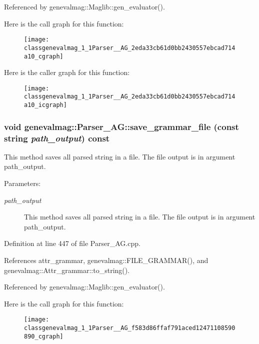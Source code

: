 Referenced by genevalmag::Maglib::gen\_\-evaluator().

Here is the call graph for this function:\nopagebreak
\begin{figure}[H]
\begin{center}
\leavevmode
\texttt{[image: classgenevalmag\_1\_1Parser\_\_AG\_2eda33cb61d0bb2430557ebcad714a10\_cgraph]}
\end{center}
\end{figure}


Here is the caller graph for this function:\nopagebreak
\begin{figure}[H]
\begin{center}
\leavevmode
\texttt{[image: classgenevalmag\_1\_1Parser\_\_AG\_2eda33cb61d0bb2430557ebcad714a10\_icgraph]}
\end{center}
\end{figure}
\hypertarget{classgenevalmag_1_1Parser__AG_f583d86ffaf791aced12471108590890}{
\subsubsection[{save\_\-grammar\_\-file}]{\setlength{\rightskip}{0pt plus 5cm}void genevalmag::Parser\_\-AG::save\_\-grammar\_\-file (const string {\em path\_\-output}) const}}
\label{classgenevalmag_1_1Parser__AG_f583d86ffaf791aced12471108590890}


This method saves all parsed string in a file. The file output is in argument path\_\-output. \begin{Desc}
\item[Parameters:]
\begin{description}
\item[{\em path\_\-output}]This method saves all parsed string in a file. The file output is in argument path\_\-output. \end{description}
\end{Desc}


Definition at line 447 of file Parser\_\-AG.cpp.

References attr\_\-grammar, genevalmag::FILE\_\-GRAMMAR(), and genevalmag::Attr\_\-grammar::to\_\-string().

Referenced by genevalmag::Maglib::gen\_\-evaluator().

Here is the call graph for this function:\nopagebreak
\begin{figure}[H]
\begin{center}
\leavevmode
\texttt{[image: classgenevalmag\_1\_1Parser\_\_AG\_f583d86ffaf791aced12471108590890\_cgraph]}
\end{center}
\end{figure}


